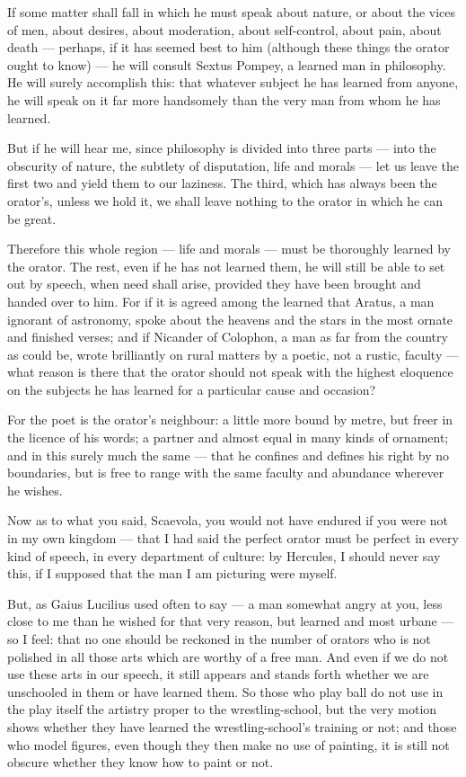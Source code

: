  If some matter shall fall in which he must speak about nature, or about the vices of men, about desires, about moderation, about self-control, about pain, about death — perhaps, if it has seemed best to him (although these things the orator ought to know) — he will consult Sextus Pompey, a learned man in philosophy. He will surely accomplish this: that whatever subject he has learned from anyone, he will speak on it far more handsomely than the very man from whom he has learned.

 But if he will hear me, since philosophy is divided into three parts — into the obscurity of nature, the subtlety of disputation, life and morals — let us leave the first two and yield them to our laziness. The third, which has always been the orator's, unless we hold it, we shall leave nothing to the orator in which he can be great.

 Therefore this whole region — life and morals — must be thoroughly learned by the orator. The rest, even if he has not learned them, he will still be able to set out by speech, when need shall arise, provided they have been brought and handed over to him. For if it is agreed among the learned that Aratus, a man ignorant of astronomy, spoke about the heavens and the stars in the most ornate and finished verses; and if Nicander of Colophon, a man as far from the country as could be, wrote brilliantly on rural matters by a poetic, not a rustic, faculty — what reason is there that the orator should not speak with the highest eloquence on the subjects he has learned for a particular cause and occasion?

 For the poet is the orator's neighbour: a little more bound by metre, but freer in the licence of his words; a partner and almost equal in many kinds of ornament; and in this surely much the same — that he confines and defines his right by no boundaries, but is free to range with the same faculty and abundance wherever he wishes.

 Now as to what you said, Scaevola, you would not have endured if you were not in my own kingdom — that I had said the perfect orator must be perfect in every kind of speech, in every department of culture: by Hercules, I should never say this, if I supposed that the man I am picturing were myself.

 But, as Gaius Lucilius used often to say — a man somewhat angry at you, less close to me than he wished for that very reason, but learned and most urbane — so I feel: that no one should be reckoned in the number of orators who is not polished in all those arts which are worthy of a free man. And even if we do not use these arts in our speech, it still appears and stands forth whether we are unschooled in them or have learned them. So those who play ball do not use in the play itself the artistry proper to the wrestling-school, but the very motion shows whether they have learned the wrestling-school's training or not; and those who model figures, even though they then make no use of painting, it is still not obscure whether they know how to paint or not.

